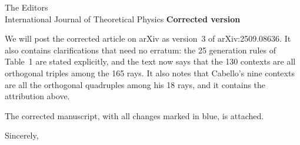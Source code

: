 \documentclass[11pt]{letter}
\begin{document}
\begin{letter}{The Editors\\
International Journal of Theoretical Physics}
\medskip\noindent\textbf{Corrected version}

We will post the corrected article on arXiv as version~3 of arXiv:2509.08636.
It also contains clarifications that need no erratum: the 25 generation rules of Table~1 are stated explicitly, and the text now says that the 130 contexts are all orthogonal triples among the 165 rays.
It also notes that Cabello's nine contexts are all the orthogonal quadruples among his 18 rays, and it contains the attribution above.

The corrected manuscript, with all changes marked in blue, is attached.

\closing{Sincerely,}

\end{letter}
\end{document}

